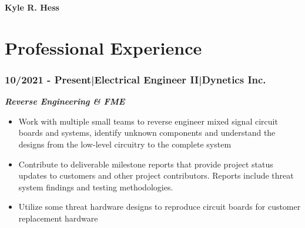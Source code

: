 \documentclass[]{article}
\begin{document}
\begin{singlespace}
\noindent\textbf{\huge{Kyle R. Hess}}
\hfill \break
\noindent\makebox[\linewidth]{\rule{\textwidth}{1pt}}
    \vspace{-8mm}

\section*{Professional Experience}

\subsubsection*{10/2021 - Present\hspace{3 mm}|\hspace{3 mm}Electrical Engineer II\hspace{3 mm}|\hspace{3 mm}Dynetics Inc.}

\noindent\textbf{\emph{Reverse Engineering \& FME}}    
\begin{itemize}
    \setlength\itemsep{0em}
    \item Work with multiple small teams to reverse engineer mixed signal circuit boards and systems, 
    identify unknown components and understand the designs from the low-level circuitry to the complete system
    \item Contribute to deliverable milestone reports that provide project status updates to customers 
    and other project contributors. Reports include threat system findings and testing methodologies.
    \item Utilize some threat hardware designs to reproduce circuit boards for customer replacement hardware 
\end{itemize}


\end{singlespace}
\end{document}
